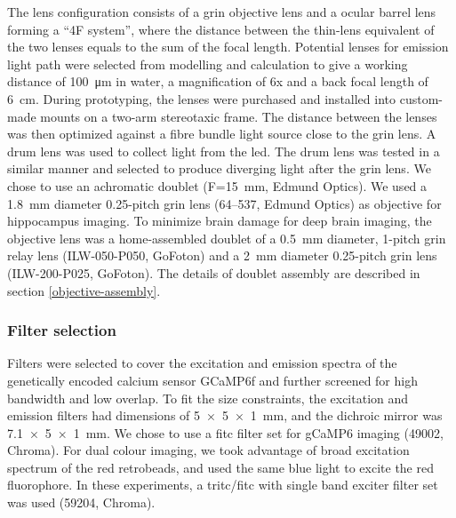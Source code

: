 The lens configuration consists of a \gls{grin} objective lens and a ocular barrel lens forming a ``4F system'', where the distance between the thin-lens equivalent of the two lenses equals to the sum of the focal length. Potential lenses for emission light path were selected from modelling and calculation to give a working distance of \SI{100}{\um} in water, a magnification of 6x and a back focal length of \SI{6}{\cm}. During prototyping, the lenses were purchased and installed into custom-made mounts on a two-arm stereotaxic frame. The distance between the lenses was then optimized against a fibre bundle light source close to the \gls{grin} lens. A drum lens was used to collect light from the \gls{led}. The drum lens was tested in a similar manner and selected to produce diverging light after the \gls{grin} lens. We chose to use an achromatic doublet (F=\SI{15}{\mm}, Edmund Optics). We used a \SI{1.8}{\mm} diameter 0.25-pitch \gls{grin} lens (64--537, Edmund Optics) as objective for hippocampus imaging. To minimize brain damage for deep brain imaging, the objective lens was a home-assembled doublet of a \SI{0.5}{\mm} diameter, 1-pitch \gls{grin} relay lens (ILW-050-P050, GoFoton) and a \SI{2}{\mm} diameter 0.25-pitch \gls{grin} lens (ILW-200-P025, GoFoton). The details of doublet assembly are described in section \ref{objective-assembly}.

\subsubsection{Filter selection}
Filters were selected to cover the excitation and emission spectra of the genetically encoded calcium sensor GCaMP6f \citep{chen13} and further screened for high bandwidth and low overlap. To fit the size constraints, the excitation and emission filters had dimensions of \SI{5x5x1}{\mm}, and the dichroic mirror was \SI{7.1x5x1}{\mm}. We chose to use a \gls{fitc} filter set for gCaMP6 imaging (49002, Chroma). For dual colour imaging, we took advantage of broad excitation spectrum of the red retrobeads, and used the same blue light to excite the red fluorophore. In these experiments, a \acrshort{tritc}\slash\acrshort{fitc} with single band exciter filter set was used (59204, Chroma).

